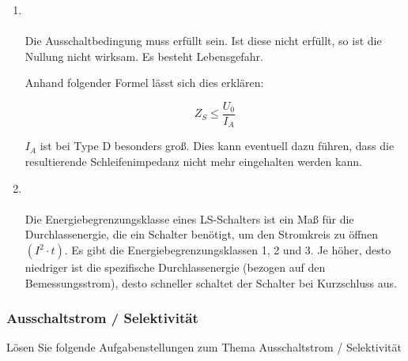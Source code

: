 \begin{enumerate}
    \item   {} \\\\
            Die Ausschaltbedingung muss erfüllt sein. Ist diese nicht erfüllt, so ist die Nullung nicht wirksam. Es besteht Lebensgefahr.

            Anhand folgender Formel lässt sich dies erklären:

            $$Z_S \le \frac{U_0}{I_A}$$

            $I_A$ ist bei Type D besonders groß. Dies kann eventuell dazu führen, dass die resultierende Schleifenimpedanz 
            nicht mehr eingehalten werden kann.

    \item   {} \\\\
            Die Energiebegrenzungsklasse eines LS-Schalters ist ein Maß für die Durchlassenergie, die ein Schalter benötigt, um den Stromkreis zu öffnen $\left(I^2\cdot t\right)$.
            Es gibt die Energiebegrenzungsklassen 1, 2 und 3. Je höher, desto niedriger ist die spezifische Durchlassenergie (bezogen auf den Bemessungsstrom), desto schneller schaltet der Schalter bei Kurzschluss aus.         
\end{enumerate}

\subsubsection{Ausschaltstrom / Selektivität}
Lösen Sie folgende Aufgabenstellungen zum Thema Ausschaltstrom / Selektivität

